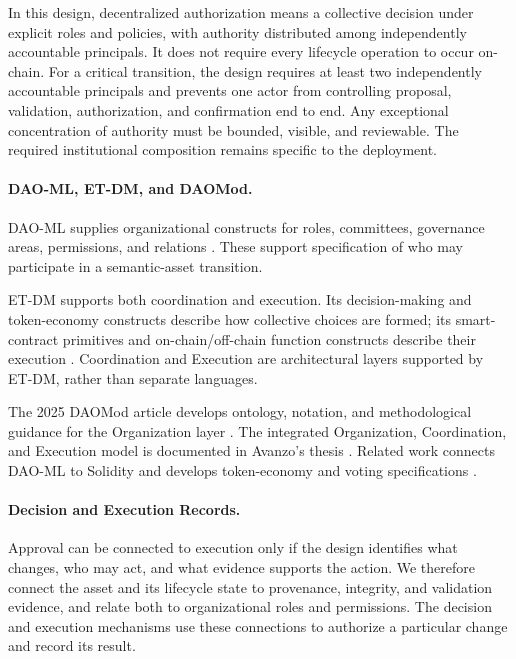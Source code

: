 \documentclass[journal]{IEEEtran}
\begin{document}
In this design, decentralized authorization means a collective
decision under explicit roles and policies, with authority
distributed among independently accountable principals.
It does not require every lifecycle operation to occur
on-chain. For a critical transition, the design requires
at least two independently accountable principals and prevents
one actor from controlling proposal, validation, authorization,
and confirmation end to end. Any exceptional concentration
of authority must be bounded, visible, and reviewable.
The required institutional composition remains specific
to the deployment.

\paragraph{DAO-ML, ET-DM, and DAOMod.}

DAO-ML supplies organizational constructs for roles, committees,
governance areas, permissions, and relations
\cite{Avanzo2024DAOML}. These support specification of who
may participate in a semantic-asset transition.

ET-DM supports both coordination and execution. Its
decision-making and token-economy constructs describe how
collective choices are formed; its smart-contract primitives
and on-chain/off-chain function constructs describe their
execution \cite{Avanzo2025Thesis}. Coordination and Execution
are architectural layers supported by ET-DM, rather than
separate languages.

The 2025 DAOMod article develops ontology, notation, and
methodological guidance for the Organization layer
\cite{Avanzo2025DAOMod}. The integrated Organization,
Coordination, and Execution model is documented in
Avanzo's thesis \cite{Avanzo2025Thesis}.
Related work connects DAO-ML to Solidity
\cite{Avanzo2025DAOMLtoSolidity} and develops token-economy
and voting specifications \cite{Avanzo2026DAOModCoordination}.

\paragraph{Decision and Execution Records.}

Approval can be connected to execution only if the design identifies
what changes, who may act, and what evidence supports the action.
We therefore connect the asset and its lifecycle state to provenance,
integrity, and validation evidence, and relate both to organizational
roles and permissions. The decision and execution mechanisms use
these connections to authorize a particular change and record its result.
\end{document}
